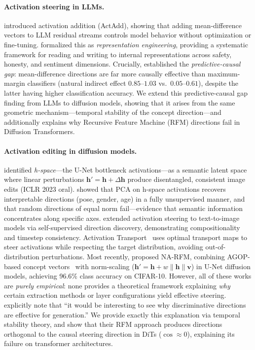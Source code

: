 \documentclass{article}
\theoremstyle{definition}
\newcommand{\bv}{\mathbf{v}}
\newcommand{\bh}{\mathbf{h}}
\begin{document}
\paragraph{Activation steering in LLMs.}
\citet{turner2023activation} introduced activation addition (ActAdd), showing that adding mean-difference vectors to LLM residual streams controls model behavior without optimization or fine-tuning.
\citet{zou2023representation} formalized this as \emph{representation engineering}, providing a systematic framework for reading and writing to internal representations across safety, honesty, and sentiment dimensions.
Crucially, \citet{marks2024geometry} established the \emph{predictive-causal gap}: mean-difference directions are far more causally effective than maximum-margin classifiers (natural indirect effect $0.85$--$1.03$ vs.\ $0.05$--$0.61$), despite the latter having higher classification accuracy.
We extend this predictive-causal gap finding from LLMs to diffusion models, showing that it arises from the same geometric mechanism---temporal stability of the concept direction---and additionally explains why Recursive Feature Machine (RFM) directions fail in Diffusion Transformers.

\paragraph{Activation editing in diffusion models.}
\citet{kwon2023diffusion} identified \emph{h-space}---the U-Net bottleneck activations---as a semantic latent space where linear perturbations $\bh' = \bh + \Delta\bh$ produce disentangled, consistent image edits (ICLR 2023 oral).
\citet{haas2023discovering} showed that PCA on h-space activations recovers interpretable directions (pose, gender, age) in a fully unsupervised manner, and that random directions of equal norm fail---evidence that semantic information concentrates along specific axes.
\citet{li2024self} extended activation steering to text-to-image models via self-supervised direction discovery, demonstrating compositionality and timestep consistency.
Activation Transport~\citep{kramar2025controlling} uses optimal transport maps to steer activations while respecting the target distribution, avoiding out-of-distribution perturbations.
Most recently, \citet{wang2026general} proposed NA-RFM, combining AGOP-based concept vectors~\citep{radhakrishnan2024mechanism} with norm-scaling ($\bh' = \bh + w\|\bh\|\bv$) in U-Net diffusion models, achieving 96.6\% class accuracy on CIFAR-10.
However, all of these works are \emph{purely empirical}: none provides a theoretical framework explaining \emph{why} certain extraction methods or layer configurations yield effective steering.
\citet{wang2026general} explicitly note that ``it would be interesting to see why discriminative directions are effective for generation.''
We provide exactly this explanation via temporal stability theory, and show that their RFM approach produces directions orthogonal to the causal steering direction in DiTs ($\cos \approx 0$), explaining its failure on transformer architectures.
\end{document}
